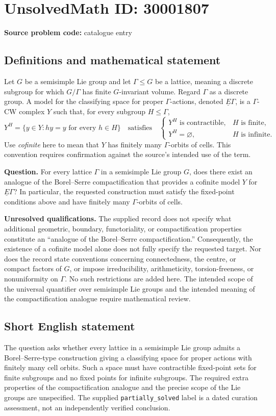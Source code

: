 \documentclass[11pt]{article}
\begin{document}
\section*{UnsolvedMath ID: 30001807}
\textbf{Source problem code:} catalogue entry
\subsection{Definitions and mathematical statement}
Let \(G\) be a semisimple Lie group and let \(\Gamma\leq G\) be a lattice, meaning a discrete subgroup for which \(G/\Gamma\) has finite \(G\)-invariant volume. Regard \(\Gamma\) as a discrete group. A model for the classifying space for proper \(\Gamma\)-actions, denoted \(\underline{E}\Gamma\), is a \(\Gamma\)-CW complex \(Y\) such that, for every subgroup \(H\leq\Gamma\),
\[
Y^H=\{y\in Y:hy=y\text{ for every }h\in H\}
\quad\text{satisfies}\quad
\begin{cases}
Y^H\text{ is contractible},&H\text{ is finite},\\
Y^H=\varnothing,&H\text{ is infinite}.
\end{cases}
\]
Use \emph{cofinite} here to mean that \(Y\) has finitely many \(\Gamma\)-orbits of cells. This convention requires confirmation against the source's intended use of the term.

\textbf{Question.} For every lattice \(\Gamma\) in a semisimple Lie group \(G\), does there exist an analogue of the Borel--Serre compactification that provides a cofinite model \(Y\) for \(\underline{E}\Gamma\)? In particular, the requested construction must satisfy the fixed-point conditions above and have finitely many \(\Gamma\)-orbits of cells.

\textbf{Unresolved qualifications.} The supplied record does not specify what additional geometric, boundary, functoriality, or compactification properties constitute an ``analogue of the Borel--Serre compactification.'' Consequently, the existence of a cofinite model alone does not fully specify the requested target. Nor does the record state conventions concerning connectedness, the centre, or compact factors of \(G\), or impose irreducibility, arithmeticity, torsion-freeness, or nonuniformity on \(\Gamma\). No such restrictions are added here. The intended scope of the universal quantifier over semisimple Lie groups and the intended meaning of the compactification analogue require mathematical review.
\subsection{Short English statement}
The question asks whether every lattice in a semisimple Lie group admits a Borel--Serre-type construction giving a classifying space for proper actions with finitely many cell orbits. Such a space must have contractible fixed-point sets for finite subgroups and no fixed points for infinite subgroups. The required extra properties of the compactification analogue and the precise scope of the Lie groups are unspecified. The supplied \texttt{partially\_solved} label is a dated curation assessment, not an independently verified conclusion.
\end{document}
